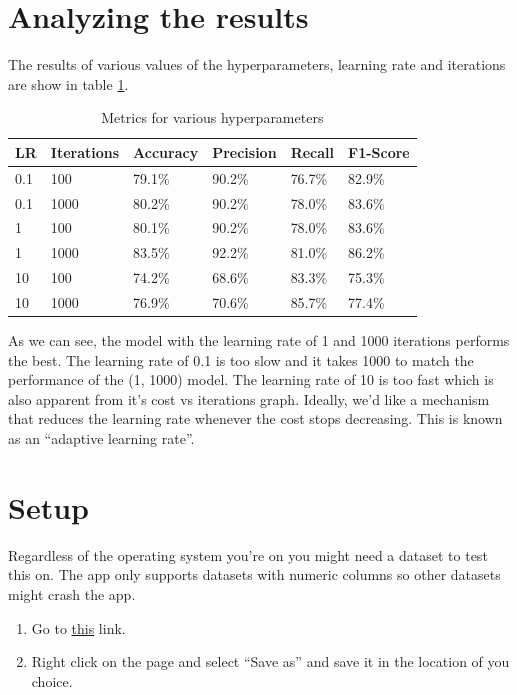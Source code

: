 \documentclass[12pt, a4]{article}
\begin{document}
\section{Analyzing the results}

The results of various values of the hyperparameters, learning rate and
iterations are show in table \ref{table:hyperparams}.

\begin{table}[h]
  \centering
  \begin{tabular}{| p{2cm} | p{2cm} || p{2cm} | p{2cm} | p{2cm} | p{2cm} |}
    \hline
    LR & Iterations & Accuracy & Precision & Recall & F1-Score \\
    \hline
    0.1 & 100  & 79.1\% & 90.2\% & 76.7\% & 82.9\%  \\
    0.1 & 1000 & 80.2\% & 90.2\% & 78.0\% & 83.6\%  \\
    1   & 100  & 80.1\% & 90.2\% & 78.0\% & 83.6\%  \\
    1   & 1000 & 83.5\% & 92.2\% & 81.0\% & 86.2\%  \\
    10  & 100  & 74.2\% & 68.6\% & 83.3\% & 75.3\%  \\
    10  & 1000 & 76.9\% & 70.6\% & 85.7\% & 77.4\%  \\
    \hline
  \end{tabular}
\caption{Metrics for various hyperparameters}
\label{table:hyperparams}
\end{table}

As we can see, the model with the learning rate of 1 and 1000 iterations
performs the best. The learning rate of 0.1 is too slow and it takes 1000 to
match the performance of the (1, 1000) model. The learning rate of 10 is too
fast which is also apparent from it's cost vs iterations graph. Ideally, we'd
like a mechanism that reduces the learning rate whenever the cost stops
decreasing. This is known as an ``adaptive learning rate''.

\section{Setup}

Regardless of the operating system you're on you might need a dataset to test
this on. The app only supports datasets with numeric columns so other datasets
might crash the app.

\begin{enumerate}
  \item{Go to \href{https://raw.githubusercontent.com/ArchitBhonsle/gtk-rs-experiment/main/data/heart.csv}{this}
        link.}
  \item{Right click on the page and select ``Save as''} and save it in the location of you choice.
\end{enumerate}
\end{document}
